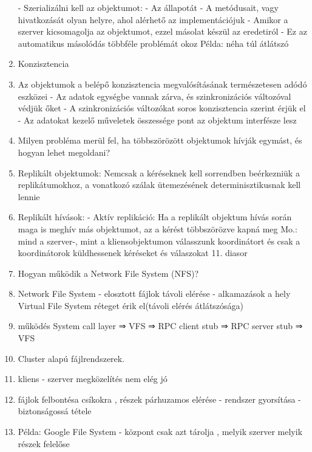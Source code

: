 \documentclass[twoside, a4paper, 12pt]{article}
\begin{document}
\begin{enumerate}
                - Szerializálni kell az objektumot:
                - Az állapotát
                - A metódusait, vagy hivatkozását olyan helyre, ahol alérhető az implementációjuk
                - Amikor a szerver kicsomagolja az objektumot, ezzel másolat készül az eredetiról
                - Ez az automatikus másolódás többféle problémát okoz Példa: néha túl átlátszó
            \item  Konzisztencia 
            \item Az objektumok a belépő konzisztencia megvalósításának természetesen adódó eszközei
                - Az adatok egységbe vannak zárva, és szinkronizációs változóval védjük őket
                - A szinkronizációs változókat soros konzisztencia szerint érjük el
                - Az adatokat kezelő műveletek összessége pont az objektum interfésze lesz
            \item  Milyen probléma merül fel, ha többszörözött objektumok hívják
                egymást, és hogyan lehet megoldani?  
            \item Replikált objektumok: Nemcsak a kéréseknek kell sorrendben beérkezniük a replikátumokhoz, a vonatkozó szálak ütemezésének
                determinisztikusnak kell lennie
            \item Replikált hívások:
                - Aktív replikáció: Ha a replikált objektum hívás során maga is meghív más objektumot, az a kérést többszörözve kapná meg
                Mo.: mind a szerver-, mint a kliensobjektumon válasszunk koordinátort és csak a koordinátorok küldhessenek kéréseket és válaszokat
                11. diasor
            \item  Hogyan működik a Network File System (NFS)?
            \item Network File System
                - elosztott fájlok távoli elérése
                - alkamazások a hely Virtual File System réteget érik el(távoli elérés átlátszósága)
            \item működés
                System call layer ⇒ VFS ⇒ RPC client stub ⇒ RPC server stub ⇒ VFS 
            \item  Cluster alapú fájlrendszerek.  
            \item kliens - szerver megközelítés nem elég jó 
            \item fájlok felbontésa csíkokra , részek párhuzamos elérése
                - rendszer gyorsítása
                - biztonságossá tétele
            \item Példa: Google File System
                - központ csak azt tárolja , melyik szerver melyik részek felelőse

\end{enumerate}
\end{document}
